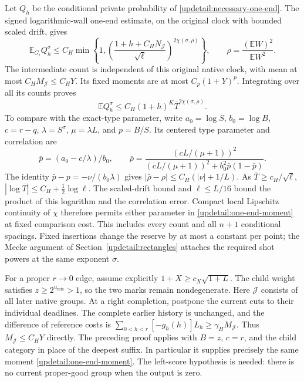 Let $Q_h$ be the conditional private probability of
\eqref{updetail:necessary-one-end}. The signed logarithmic-wall
one-end estimate, on the original clock with bounded scaled drift,
gives
\[
 \mathbb E_{G_i}Q_h^\sigma
 \leq C_H\min\left\{1,
 \left(\frac{1+h+C_HN_{\mathcal J}}{\sqrt\ell}\right)^{2\chi(\sigma,\rho)}
 \right\},\qquad
 \rho=\frac{(\mathbb EW)^2}{\mathbb E W^2}.
\]
The intermediate count is independent of this original native clock,
with mean at most $C_HM_{\mathcal J}\leq C_HY$. Its fixed moments
are at most $C_p(1+Y)^p$. Integrating over all its counts proves
\begin{equation}
 \mathbb E Q_h^\sigma\leq C_H(1+h)^K\overline T^{2\chi(\sigma,\rho)}.
 \label{updetail:one-end-moment}
\end{equation}
To compare with the exact-type parameter, write $a_0=\log S$,
$b_0=\log B$, $c=r-q$, $\lambda=S^\sigma$, $\mu=\lambda L$,
and $p=B/S$. Its centered type parameter and correlation are
\[
 \bar p=(a_0-c/\lambda)/b_0,
 \qquad
 \bar\rho=\frac{(cL/(\mu+1))^2}
 {(cL/(\mu+1))^2+b_0^2\bar p(1-\bar p)}.
\]
The identity $\bar p-p=-\nu/(b_0\lambda)$ gives
$|\bar\rho-\rho|\leq C_H(|\nu|+1/L)$.
As $\overline T\geq c_H/\sqrt\ell$,
$|\log\overline T|\leq C_H+\tfrac12\log\ell$.
The scaled-drift bound and $\ell\leq L/16$ bound the product of
this logarithm and the correlation error. Compact local Lipschitz
continuity of $\chi$ therefore permits either parameter in
\eqref{updetail:one-end-moment} at fixed comparison cost.
This includes every count and all $n+1$ conditional spacings.
Fixed insertions change the reserve by at most a constant per point;
the Mecke argument of Section~\ref{updetail:rectangles} attaches
the required shot powers at the same exponent $\sigma$.

For a proper $r\to0$ edge, assume explicitly
$1+X\geq c_X\sqrt{1+L}$. The child weight satisfies
$z\geq2^{u_{\min}}>1$, so the two marks remain nondegenerate.
Here $\mathcal J$ consists of all later native groups. At a right
completion, postpone the current cuts to their individual deadlines.
The complete earlier history is unchanged, and the difference of
reference costs is
$\sum_{0<h<r}[-g_h(h)]L_h\geq\gamma_HM_{\mathcal J}$.
Thus $M_{\mathcal J}\leq C_HY$ directly. The preceding proof applies
with $B=z$, $c=r$, and the child category in place of the deepest
suffix. In particular it supplies precisely the same moment
\eqref{updetail:one-end-moment}. The left-score hypothesis is needed:
there is no current proper-good group when the output is zero.

